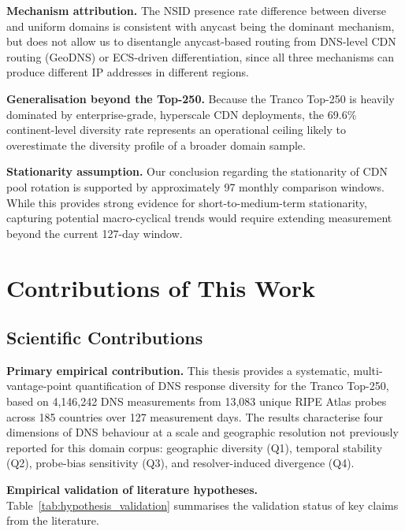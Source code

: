 \textbf{Mechanism attribution.} The \ac{NSID} presence rate difference between diverse and uniform domains is consistent with anycast being the dominant mechanism, but does not allow us to disentangle anycast-based routing from \ac{DNS}-level \ac{CDN} routing (GeoDNS) or \ac{ECS}-driven differentiation, since all three mechanisms can produce different \ac{IP} addresses in different regions.

\textbf{Generalisation beyond the Top-250.} Because the Tranco Top-250 is heavily dominated by enterprise-grade, hyperscale \ac{CDN} deployments, the 69.6\% continent-level diversity rate represents an operational ceiling likely to overestimate the diversity profile of a broader domain sample.

\textbf{Stationarity assumption.} Our conclusion regarding the stationarity of \ac{CDN} pool rotation is supported by approximately 97 monthly comparison windows. While this provides strong evidence for short-to-medium-term stationarity, capturing potential macro-cyclical trends would require extending measurement beyond the current 127-day window.

\bigskip
\section{Contributions of This Work}
\label{sec:5.3}

\subsection{Scientific Contributions}
\label{subsec:5.3.1}

\textbf{Primary empirical contribution.}
This thesis provides a systematic, multi-vantage-point quantification of \ac{DNS} response diversity for the Tranco Top-250, based on 4,146,242 \ac{DNS} measurements from 13,083 unique RIPE Atlas probes across 185 countries over 127 measurement days. The results characterise four dimensions of \ac{DNS} behaviour at a scale and geographic resolution not previously reported for this domain corpus: geographic diversity (Q1), temporal stability (Q2), probe-bias sensitivity (Q3), and resolver-induced divergence (Q4).

\textbf{Empirical validation of literature hypotheses.} Table~\ref{tab:hypothesis_validation} summarises the validation status of key claims from the literature.

